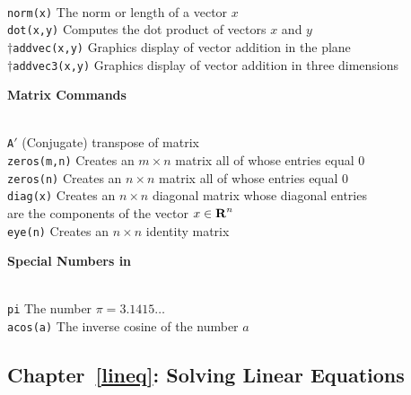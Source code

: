 \documentclass{ximera}
\begin{document}
\begin{tabbing}
 \hspace{1.1in} \= \\
{\tt norm(x)}  \> The norm or length of a vector $x$ \\  
{\tt dot(x,y)}  \> Computes the dot product of vectors $x$ and $y$ \\
$\dagger${\tt addvec(x,y)}  \> Graphics display of vector addition in the plane \\
$\dagger${\tt addvec3(x,y)}  \> Graphics display of vector addition in three dimensions 
\end{tabbing}
 


\centerline{
{\bf Matrix Commands}
} \vspace*{-0.1in}
 
\begin{tabbing}
 \hspace{1.1in} \= \\
{\tt A$'$}\> (Conjugate) transpose of matrix\\ 
{\tt zeros(m,n)} \> 
Creates an $m\times n$ matrix all of whose entries equal $0$  \\ 
{\tt zeros(n)} \> Creates an $n\times n$ matrix all of whose entries equal $0$\\
{\tt diag(x)} \> Creates an 
$n\times n$ diagonal matrix whose diagonal entries
\\ \> are the components of the vector $x\in\mbox{$\bf{R}$}^n$\\
{\tt eye(n)}\>  Creates an $n\times n$ identity matrix 
\end{tabbing}



\centerline{
{\bf Special Numbers in \Matlab}
} \vspace*{-0.1in}

\begin{tabbing}
 \hspace{1.1in} \= \\
 {\tt pi} \> The number $\pi=3.1415\ldots$ \\ 
{\tt acos(a)} \>
  The inverse cosine of the number $a$  
\end{tabbing}



\subsection*{Chapter~\ref{lineq}: Solving Linear Equations}
\end{document}
